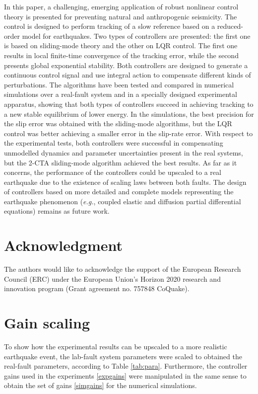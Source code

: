 \documentclass[journal,twoside,web]{ieeecolor}
\begin{document}
In this paper, a challenging, emerging application of robust nonlinear control theory is presented for preventing natural and anthropogenic seismicity. The control is designed to perform tracking of a slow reference based on a reduced-order model for earthquakes. Two types of controllers are presented: the first one is based on sliding-mode theory and the other on LQR control. The first one results in local finite-time convergence of the tracking error, while the second presents global exponential stability. Both controllers are designed to generate a continuous control signal and use integral action to compensate different kinds of perturbations. The algorithms have been tested and compared in numerical simulations over a real-fault system and in a specially designed experimental apparatus, showing that both types of controllers succeed in achieving tracking to a new stable equilibrium of lower energy. In the simulations, the best precision for the slip error was obtained with the sliding-mode algorithms, but the LQR control was better achieving a smaller error in the slip-rate error. With respect to the experimental tests, both controllers were successful in compensating unmodelled dynamics and parameter uncertainties present in the real systems, but the 2-CTA sliding-mode algorithm achieved the best results. As far as it concerns, the performance of the controllers could be upscaled to a real earthquake due to the existence of scaling laws between both faults. The design of controllers based on more detailed and complete models representing the earthquake phenomenon (\textit{e.g.}, coupled elastic and diffusion partial differential equations) remains as future work.

\appendices

\section*{Acknowledgment}

The authors would like to acknowledge the support of the European Research Council (ERC) under the European Union’s Horizon 2020 research and innovation program (Grant agreement no. 757848 CoQuake).

\section{Gain scaling}
\label{sec:app1}

To show how the experimental results can be upscaled to a more realistic earthquake event, the lab-fault system parameters were scaled to obtained the real-fault parameters, according to Table \ref{tab:para}. Furthermore, the controller gains used in the experiments \eqref{expgains} were manipulated in the same sense to obtain the set of gains \eqref{simgains} for the numerical simulations.
\end{document}
